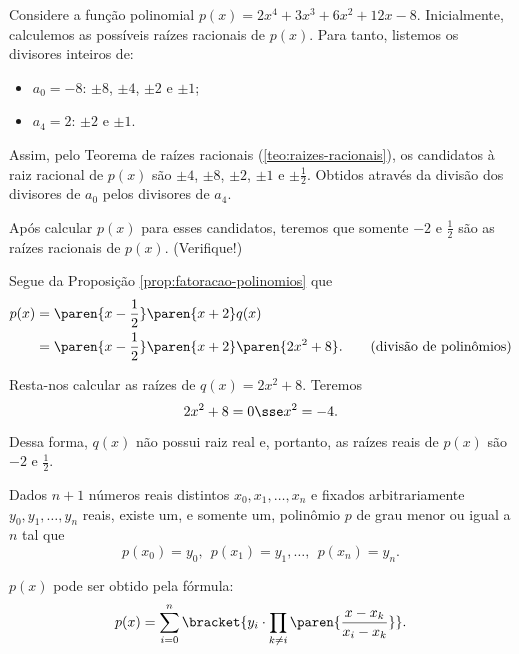 \begin{solution}
    Considere a função polinomial $p(x) = 2x^4 + 3x^3 + 6x^2 + 12x -8$. Inicialmente, calculemos as possíveis raízes racionais de $p(x)$. Para tanto, listemos os divisores inteiros de:
    \begin{itemize}
        \item $a_0 = -8$: $\pm 8$, $\pm 4$, $\pm 2$ e $\pm 1$;
        \item $a_4 = 2$: $\pm 2$ e $\pm 1$.
    \end{itemize}
    Assim, pelo Teorema de raízes racionais (\ref{teo:raizes-racionais}), os candidatos à raiz racional de $p(x)$ são $\pm 4$, $\pm 8$, $\pm 2$, $\pm 1$ e $\pm \frac 1 2$. Obtidos através da divisão dos divisores de $a_0$ pelos divisores de $a_4$.

    Após calcular $p(x)$ para esses candidatos, teremos que somente $-2$ e $\frac 1 2$ são as raízes racionais de $p(x)$. (Verifique!)

    Segue da Proposição \ref{prop:fatoracao-polinomios} que
    \begin{align*}
        p(x) & = \paren{x - \frac 1 2} \paren{x+2} q(x) \\
            & = \paren{x - \frac 1 2} \paren{x+2} \paren{2x^2 + 8}. \tag{divisão de polinômios}
    \end{align*} 

    Resta-nos calcular as raízes de $q(x) = 2x^2 + 8$. Teremos
    $$2x^2 + 8 = 0 \sse x^2 = -4.$$

    Dessa forma, $q(x)$ não possui raiz real e, portanto, as raízes reais de $p(x)$ são $-2$ e $\frac 1 2$.
\end{solution}

\begin{proposition}
Dados $n+1$ números reais distintos $x_0, x_1 , \dots , x_n$ e
fixados arbitrariamente $y_0, y_1, \dots, y_n$ reais, existe
um, e somente um, polinômio $p$ de grau menor ou igual a $n$ tal que
$$p(x_0) = y_0, \ \ p(x_1) = y_1,  \dots , \ \ p(x_n) = y_n.$$

$p(x)$ pode ser obtido pela fórmula:
$$p(x) = \sum_{i=0}^{n} \bracket{y_i \cdot \prod_{k \neq i} \paren{\frac {x-
x_k}{x_i-x_k}}}.$$
\end{proposition}